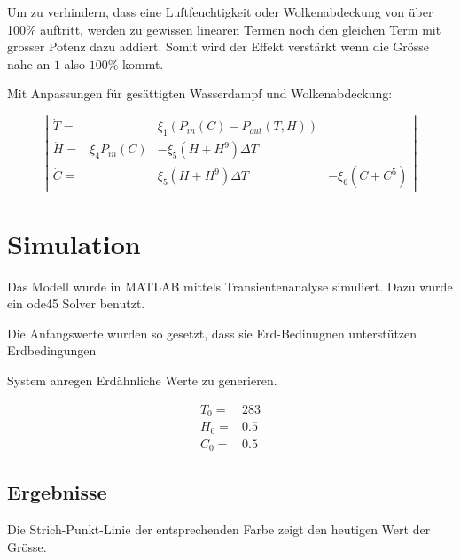 \begin{refsection}
Um zu verhindern, dass eine Luftfeuchtigkeit oder Wolkenabdeckung von über 100\% auftritt, werden zu gewissen linearen Termen noch den gleichen Term mit grosser Potenz dazu addiert. Somit wird der Effekt verstärkt wenn die Grösse nahe an $1$ also $100\%$ kommt.  

Mit Anpassungen für gesättigten Wasserdampf und Wolkenabdeckung:

\begin{equation}
\left|
\begin{matrix}
\dot{T} = & & \xi_1 \left(P_{in}(C) - P_{out}(T, H) \right) &\\
\dot{H} = & \xi_4 P_{in}(C) & - \xi_5 (H + H^9) \Delta T & \\
\dot{C} = &                 &   \xi_5 (H + H^9) \Delta T & - \xi_6 (C + C^5)
\end{matrix}
\right|
\end{equation}


\section{Simulation}

Das Modell wurde in MATLAB mittels Transientenanalyse simuliert. Dazu wurde ein ode45 Solver benutzt.




Die Anfangswerte wurden so gesetzt, dass sie Erd-Bedinugnen unterstützen  
	Erdbedingungen
	
	System anregen Erdähnliche Werte zu generieren.

\begin{equation}
\begin{matrix}
T_0 = & 283 \\
H_0 = & 0.5 \\
C_0 = & 0.5
\end{matrix}
\end{equation}

\subsection{Ergebnisse}

		Die Strich-Punkt-Linie der entsprechenden Farbe zeigt den heutigen Wert der Grösse. 


\end{refsection}
